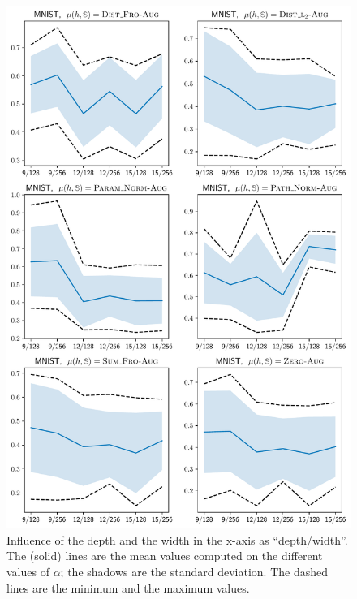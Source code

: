 \begin{noaddcontents}
\begin{figure}
    \centering
    \includegraphics[width=0.77\linewidth]{chapter_7/figures/influence_depth_mnist_aug.pdf}
    \caption{
    Influence of the depth and the width in the x-axis as ``depth/width''.
    The (solid) lines are the mean values computed on the different values of $\alpha$; the shadows are the standard deviation. 
    The dashed lines are the minimum and the maximum values.
    }
    \label{ap:dis-mu:fig:influence-depth-2}
\end{figure}


\end{noaddcontents}
